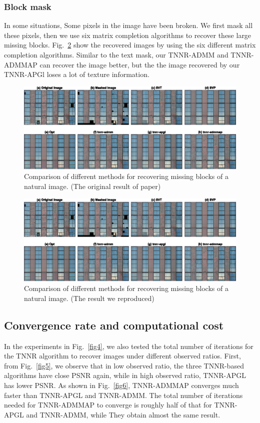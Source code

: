 \documentclass{article}
\begin{document}
{\subsubsection{Block mask}
In some situations, Some pixels in the image have been broken. We first mask all these pixels, then we use six matrix completion algorithms to recover these large missing blocks.
Fig.~\ref{fig9} show the recovered images by using the six different matrix completion algorithms.
Similar to the text mask, our TNNR-ADMM and TNNR-ADMMAP can recover the image better, but the the image recovered by our TNNR-APGl loses a lot of texture information.
\begin{figure}[htbp]
	\centering
	\includegraphics[width=1\textwidth]{./assets/fig9.eps}
	\caption{Comparison of different methods for recovering missing blocks of
		a natural image. (The original result of paper)}
	\label{fig9ori}
\end{figure}
\begin{figure}[htbp]
	\centering
	\includegraphics[width=1\textwidth]{./assets/fig9.eps}
	\caption{Comparison of different methods for recovering missing blocks of
		a natural image. (The result we reproduced)}
	\label{fig9}
\end{figure}

\subsection{Convergence rate and computational cost}
In the experiments in Fig.~\ref{fig4}, we also tested the total number of iterations for the TNNR algorithm to recover images under different observed ratios. First, from Fig.~\ref{fig5}, we observe that in low observed ratio, the three TNNR-based algorithms have close PSNR again, while in high observed ratio, TNNR-APGL has lower PSNR. As shown in Fig.~\ref{fig6}, TNNR-ADMMAP converges much faster than TNNR-APGL and TNNR-ADMM. The total number of iterations needed for TNNR-ADMMAP to converge is roughly half of that for TNNR-APGL and TNNR-ADMM, while They obtain almost the same result. 

}
\end{document}
